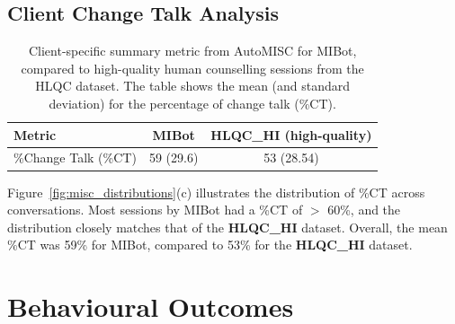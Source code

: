 \subsection{Client Change Talk Analysis}



\begin{table}[ht]
  \centering
  \small
  \setlength{\tabcolsep}{4pt}
  \renewcommand{\arraystretch}{1.1}
  \begin{tabular}{@{}lcc@{}}
    \toprule
    \textbf{Metric} & \textbf{MIBot} & \textbf{HLQC\_HI (high-quality)} \\
    \midrule
    \%Change Talk (\%CT) & 59 (29.6) & 53 (28.54) \\
    \bottomrule
  \end{tabular}
  \caption[AutoMISC Client Metrics for MIBot vs. Human]{Client-specific summary metric from AutoMISC for MIBot, compared to high-quality human counselling sessions from the HLQC dataset. The table shows the mean (and standard deviation) for the percentage of change talk (\%CT).}
  \label{table:automisc_summary_client}
\end{table}


Figure~\ref{fig:misc_distributions}(c) illustrates the distribution of \%CT across conversations. Most sessions by MIBot had a \%CT of $>$ 60\%, and the distribution closely matches that of the \textbf{HLQC\_HI} dataset. Overall, the mean \%CT was 59\% for MIBot, compared to 53\% for the \textbf{HLQC\_HI} dataset.


































\section{Behavioural Outcomes}


